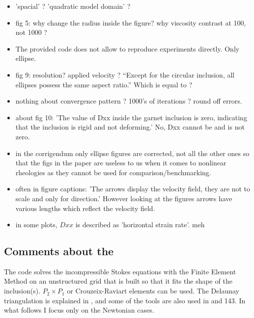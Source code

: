 \begin{itemize}
\item 'spacial' ? 'quadratic model domain' ?

\item fig 5: why change the radius inside the figure? why viscosity contrast at 100, not 1000 ?

\item The provided code does not allow to reproduce experiments directly. Only ellipse. 

\item fig 9: resolution? applied velocity ? ``Except for the circular inclusion, all ellipses possess the same aspect ratio.'' Which is equal to ?

\item nothing about convergence pattern ? 1000's of iterations ? round off errors.

\item about fig 10: 'The value of Dxx inside the garnet inclusion is zero, indicating that the inclusion is rigid and not deforming.' 
No, Dxx cannot be and is not zero. 

\item in the corrigendum only ellipse figures are corrected, not all the other ones so that the figs in the paper are useless 
to us when it comes to nonlinear rheologies as they cannot be used for comparison/benchmarking.

\item often in figure captions: 'The arrows display the velocity field, they are not to scale and only for direction.'
However looking at the figures arrows have various lengths which reflect the velocity field.

\item in some plots, $Dxx$ is described as 'horizontal strain rate'. meh 

\end{itemize}


\subsection*{Comments about the \stone}

The code solves the incompressible Stokes equations with the Finite Element Method
on an unstructured grid that is built so that it fits the shape of the inclusion(s).
$P_2\times P_1$ or Crouzeix-Raviart elements can be used.
The Delaunay triangulation is explained in , and 
some of the tools are also used in  and 143.
In what follows I focus only on the Newtonian cases.

